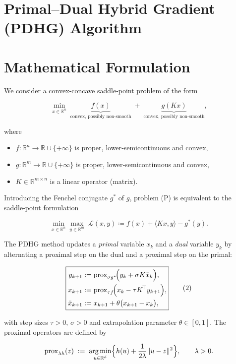 \documentclass{article}
\newcommand{\prox}{\operatorname{prox}}
\newcommand{\argmin}{\operatorname*{arg\,min}}
\newcommand{\R}{\mathbb{R}}
\begin{document}
\section*{Primal–Dual Hybrid Gradient (PDHG) Algorithm}

\section*{Mathematical Formulation}
We consider a convex‐concave saddle‑point problem of the form  

\[
\min_{x\in\R^{n}} \; \underbrace{f(x)}_{\text{convex, possibly non‑smooth}} 
\;+\; \underbrace{g(Kx)}_{\text{convex, possibly non‑smooth}},
\tag{P}
\]

where  

\begin{itemize}
    \item $f:\R^{n}\to\R\cup\{+\infty\}$ is proper, lower‑semicontinuous and convex,
    \item $g:\R^{m}\to\R\cup\{+\infty\}$ is proper, lower‑semicontinuous and convex,
    \item $K\in\R^{m\times n}$ is a linear operator (matrix).
\end{itemize}

Introducing the Fenchel conjugate $g^{*}$ of $g$, problem (P) is equivalent to the saddle‑point formulation  

\[
\min_{x\in\R^{n}}\max_{y\in\R^{m}} \; \mathcal{L}(x,y) \coloneqq f(x)+\langle Kx,y\rangle - g^{*}(y).
\tag{1}
\]

The PDHG method updates a \emph{primal} variable $x_k$ and a \emph{dual} variable $y_k$ by alternating a proximal step on the dual and a proximal step on the primal:

\[
\boxed{
\begin{aligned}
y_{k+1} &:= \prox_{\sigma g^{*}}\!\Bigl(y_k+\sigma K\bar x_k\Bigr), \\
x_{k+1} &:= \prox_{\tau f}\!\Bigl(x_k-\tau K^{\!\top} y_{k+1}\Bigr), \\
\bar x_{k+1} &:= x_{k+1}+ \theta\bigl(x_{k+1}-x_k\bigr),
\end{aligned}}
\tag{2}
\]

with step sizes $\tau>0$, $\sigma>0$ and extrapolation parameter $\theta\in[0,1]$.  
The proximal operators are defined by  

\[
\prox_{\lambda h}(z) \;:=\; \argmin_{u\in\R^{d}}\Bigl\{h(u)+\frac{1}{2\lambda}\|u-z\|^{2}\Bigr\},
\qquad \lambda>0 .
\]
\end{document}
